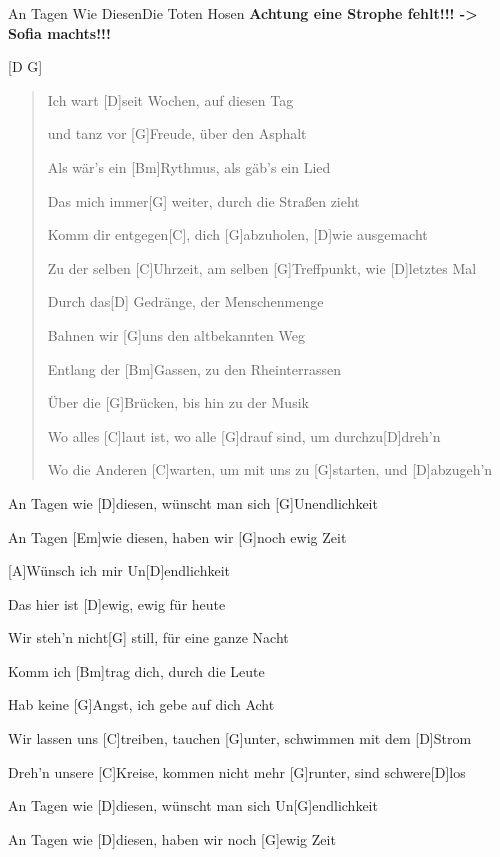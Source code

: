 \begin{song}{An Tagen Wie Diesen}{Die Toten Hosen}
\textbf{Achtung eine Strophe fehlt!!! -> Sofia machts!!!}
\begin{intro}

[D G]
\end{intro}
\begin{verse}
Ich wart [D]seit Wochen, auf diesen Tag

und tanz vor [G]Freude, über den Asphalt

Als wär's ein [Bm]Rythmus, als gäb's ein Lied

Das mich immer[G] weiter, durch die Straßen zieht

Komm dir entgegen[C], dich [G]abzuholen, [D]wie ausgemacht

Zu der selben [C]Uhrzeit, am selben [G]Treffpunkt, wie [D]letztes Mal

Durch das[D] Gedränge, der Menschenmenge

Bahnen wir [G]uns den altbekannten Weg

Entlang der [Bm]Gassen, zu den Rheinterrassen

Über die [G]Brücken, bis hin zu der Musik

Wo alles [C]laut ist, wo alle [G]drauf sind, um durchzu[D]dreh'n

Wo die Anderen [C]warten, um mit uns zu [G]starten, und [D]abzugeh'n
\end{verse}
\begin{chorus}
An Tagen wie [D]diesen, wünscht man sich [G]Unendlichkeit

An Tagen [Em]wie diesen, haben wir [G]noch ewig Zeit

   [A]Wünsch ich mir Un[D]endlichkeit

Das hier ist [D]ewig, ewig für heute

Wir steh'n nicht[G] still, für eine ganze Nacht

Komm ich [Bm]trag dich, durch die Leute

Hab keine [G]Angst, ich gebe auf dich Acht

Wir lassen uns [C]treiben, tauchen [G]unter, schwimmen mit dem [D]Strom

Dreh'n unsere [C]Kreise, kommen nicht mehr [G]runter, sind schwere[D]los
\end{chorus}
\begin{chorus}

An Tagen wie [D]diesen, wünscht man sich Un[G]endlichkeit

An Tagen wie [D]diesen, haben wir noch [G]ewig Zeit


\end{chorus}
\end{song}
